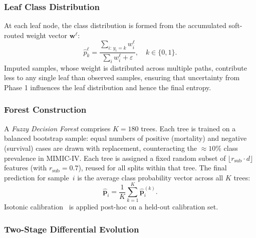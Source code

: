 \documentclass[a4paper,fleqn,longmktitle]{cas-sc}
\begin{document}
	\subsubsection{Leaf Class Distribution}
	\label{sec:leaf_distribution}
	
	At each leaf node, the class distribution is formed from the
	accumulated soft-routed weight vector $\mathbf{w}^{\ell}$:
	\begin{equation}
		\hat{p}^{\ell}_k
		= \frac{\sum_{i:\, y_i = k} w^{\ell}_i}
		{\sum_i w^{\ell}_i + \varepsilon},
		\quad k \in \{0, 1\}.
		\label{eq:leaf_distribution}
	\end{equation}
	Imputed samples, whose weight is distributed across multiple
	paths, contribute less to any single leaf than observed samples,
	ensuring that uncertainty from Phase 1 influences the leaf
	distribution and hence the final entropy.
	
	\subsubsection{Forest Construction}
	\label{sec:forest}
	
	A \emph{Fuzzy Decision Forest} comprises $K = 180$ trees.
	Each tree is trained on a balanced bootstrap sample: equal numbers
	of positive (mortality) and negative (survival) cases are drawn
	with replacement, counteracting the $\approx 10\%$ class
	prevalence in MIMIC-IV.
	Each tree is assigned a fixed random subset of $\lfloor r_{\text{sub}} \cdot d \rfloor$
	features (with $r_{\text{sub}} = 0.7$), reused for all splits within that tree.
	The final prediction for sample~$i$ is the average class probability
	vector across all $K$ trees:
	\begin{equation}
		\hat{\mathbf{p}}_i = \frac{1}{K} \sum_{k=1}^{K}
		\hat{\mathbf{p}}^{(k)}_i.
		\label{eq:forest_prediction}
	\end{equation}
	Isotonic calibration~\citep{zadrozny2002transforming} is applied
	post-hoc on a held-out calibration set.
	
	\subsubsection{Two-Stage Differential Evolution}
	\label{sec:de}
	
\end{document}
